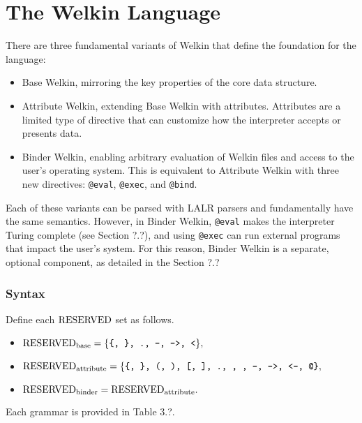 \section{The Welkin Language}

There are three fundamental variants of Welkin that define the foundation for the language:
\begin{itemize}
	\item Base Welkin, mirroring the key properties of the core data structure.
	\item Attribute Welkin, extending Base Welkin with attributes. Attributes are a limited type of directive that can customize how the interpreter accepts or presents data.
	\item Binder Welkin, enabling arbitrary evaluation of Welkin files and access to the user's operating system. This is equivalent to Attribute Welkin with three new directives: \texttt{@eval}, \texttt{@exec}, and \texttt{@bind}. \end{itemize}
Each of these variants can be parsed with LALR parsers and fundamentally have the same semantics. However, in Binder Welkin, \texttt{@eval} makes the interpreter Turing complete (see Section ?.?), and using \texttt{@exec} can run external programs that impact the user's system. For this reason, Binder Welkin is a separate, optional component, as detailed in the Section ?.?

\subsubsection*{Syntax}
Define each $\mathrm{RESERVED}$ set as follows. %
\begin{itemize}
\item $\mathrm{RESERVED}_{\textrm{base}} = \{\texttt{\{, \}, ., -, ->, <} \},$
\item $\mathrm{RESERVED}_{\textrm{attribute}} = \{\texttt{\{, \}, (, ), [, ], ., , , -, ->, <-, @\}},$
\item $\mathrm{RESERVED}_{\textrm{binder}} = \mathrm{RESERVED}_{\textrm{attribute}}.$
\end{itemize}
Each grammar is provided in Table 3.?.

